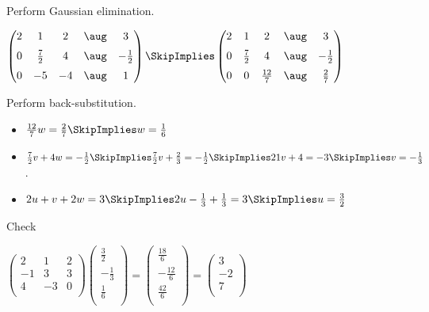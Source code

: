 \documentclass[oneside,12pt]{amsart}
\begin{document}
Perform Gaussian elimination.


\bigskip

$
\begin{pmatrix}
  2 &  1           &  2  & \aug &  3            \\[6pt]
  0 &  \frac{7}{2} &  4  & \aug & -\frac{1}{2}  \\[6pt]
  0 & -5           &  -4 & \aug &  1  \\
\end{pmatrix}
\SkipImplies
\begin{pmatrix}
  2 &  1           &  2            & \aug &  3            \\[6pt]
  0 &  \frac{7}{2} &  4            & \aug & -\frac{1}{2}  \\[6pt]
  0 &  0           &  \frac{12}{7} & \aug &  \frac{2}{7}  \\
\end{pmatrix}
$

\bigskip

Perform back-substitution.

\begin{itemize}
\item $\frac{12}{7}w = \frac{2}{7}  \SkipImplies w = \frac{1}{6}$
\item $\frac{7}{2}v + 4w = -\frac{1}{2}  \SkipImplies \frac{7}{2}v + \frac{2}{3} = -\frac{1}{2} \SkipImplies 21v + 4= -3 \SkipImplies v = -\frac{1}{3}$.
\item $2u +v +2w = 3 \SkipImplies 2u -\frac{1}{3} + \frac{1}{3}= 3 \SkipImplies u = \frac{3}{2}$
\end{itemize}

\bigskip

Check

\bigskip

$
\begin{pmatrix}
 2  &  1 &  2  \\
 -1 &  3 &  3  \\
  4 & -3 &  0  \\
\end{pmatrix}
\begin{pmatrix}
 \frac{3}{2} \\[6pt]
 -\frac{1}{3}\\[6pt]
 \frac{1}{6} \\[6pt]
\end{pmatrix}
=
\begin{pmatrix}
\frac{18}{6} \\[6pt]
-\frac{12}{6}\\[6pt]
\frac{42}{6} \\[6pt]
\end{pmatrix}
=
\begin{pmatrix}
3 \\[6pt]
-2\\[6pt]
7 \\[6pt]
\end{pmatrix}
$
\end{document}
